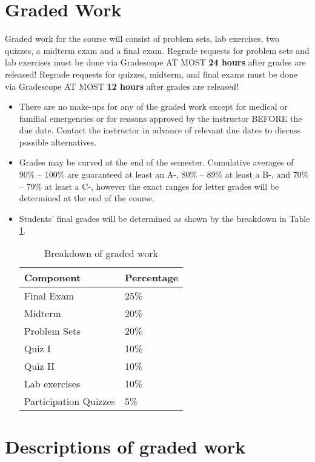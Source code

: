 \documentclass[11pt, a4paper]{article}
\begin{document}
\section{Graded Work} 
Graded work for the course will consist of problem sets, lab exercises, two quizzes, a midterm exam and a final exam. Regrade requests for problem sets and lab exercises must be done via Gradescope AT MOST \textbf{24 hours} after grades are released! Regrade requests for quizzes, midterm, and final exams must be done via Gradescope AT MOST \textbf{12 hours} after grades are released!
\begin{itemize}[label= {\color{darkblue}{\ArrowBoldRightStrobe}}]
	\item There are no make-ups for any of the graded work except for medical or familial emergencies or for reasons approved by the instructor BEFORE the due date. Contact the instructor in advance of relevant due dates to discuss possible alternatives. 
	
	\item Grades may be curved at the end of the semester. Cumulative averages of 90\% -- 100\% are guaranteed at least an A-, 80\% -- 89\% at least a B-, and 70\% -- 79\% at least a C-, however the exact ranges for letter grades will be determined at the end of the course.
	
	\item Students' final grades will be determined as shown by the breakdown in Table \ref{gradedwork}.
	\begin{table}[h]
		\centering
		\caption{Breakdown of graded work} \label{gradedwork}
		\begin{tabular}{ll}
			Component & Percentage \\ 
			\hline
			Final Exam & 25\% \\ 
			Midterm & 20\% \\
			Problem Sets & 20\% \\
			Quiz I & 10\% \\
			Quiz II & 10\% \\
			Lab exercises & 10\% \\
			Participation Quizzes & 5\% \\
			\hline 
		\end{tabular}
	\end{table}
\end{itemize}


\section{Descriptions of graded work}
\end{document}
